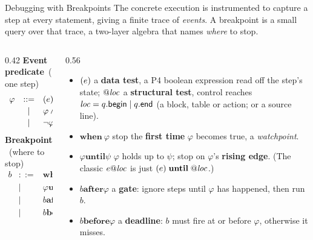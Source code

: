 \begin{frame}{Debugging with Breakpoints}
  The concrete execution is instrumented to capture a step at every statement,
  giving a finite trace of \emph{events}. A breakpoint is a small query over
  that trace, a two-layer algebra that names \emph{where} to stop.

  \vspace{0.1em}
  \begin{columns}[t,onlytextwidth]
    \begin{column}{0.42\textwidth}
      \footnotesize\textbf{Event predicate}\ (one step)
      \vspace{-0.4em}
      \[
      \begin{array}{rcl}
        \varphi &::=& (e) \ \mid\ @\mathit{loc} \\[2pt]
                &\mid& \varphi \land \varphi \ \mid\ \varphi \lor \varphi \\[2pt]
                &\mid& \lnot\varphi \ \mid\ \mathsf{true}
      \end{array}
      \]
      \vspace{-0.3em}
      \footnotesize\textbf{Breakpoint}\ (where to stop)
      \vspace{-0.4em}
      \[
      \begin{array}{rcl}
        b &::=& \mathbf{when}\ \varphi \\[3pt]
          &\mid& \varphi \mathrel{\mathbf{until}} \psi \\[3pt]
          &\mid& b \mathrel{\mathbf{after}} \varphi \\[3pt]
          &\mid& b \mathrel{\mathbf{before}} \varphi
      \end{array}
      \]
    \end{column}
    \begin{column}{0.56\textwidth}
      \scriptsize
      \begin{itemize}\setlength\itemsep{3.5pt}
        \item $(e)$ a \textbf{data test}, a P4 boolean expression read off
              the step's state; $@\mathit{loc}$ a \textbf{structural test}, control
              reaches $\mathit{loc} = q.\mathsf{begin} \mid q.\mathsf{end}$
              (a block, table or action; or a source line).
        \item $\mathbf{when}\ \varphi$ stop the \textbf{first time} $\varphi$
              becomes true, a \emph{watchpoint}.
        \item $\varphi \mathrel{\mathbf{until}} \psi$ $\varphi$ holds up to
              $\psi$; stop on $\varphi$'s \textbf{rising edge}. (The classic
              $\specExpr@\specLoc$ is just $(e) \mathrel{\mathbf{until}} @\mathit{loc}$.)
        \item $b \mathrel{\mathbf{after}} \varphi$ a \textbf{gate}: ignore steps
              until $\varphi$ has happened, then run $b$.
        \item $b \mathrel{\mathbf{before}} \varphi$ a \textbf{deadline}: $b$ must
              fire at or before $\varphi$, otherwise it misses.
      \end{itemize}
    \end{column}
  \end{columns}


\end{frame}
